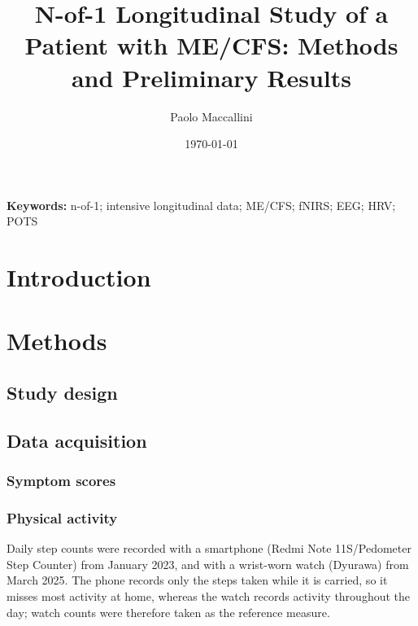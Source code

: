 \documentclass[11pt,a4paper]{article}
\title{N-of-1 Longitudinal Study of a Patient with ME/CFS: Methods and Preliminary Results}
\author[1]{Paolo Maccallini}
\affil[1]{``Independent researcher'', Rome, Italy}
\date{\today}
\begin{document}
\maketitle

\begin{abstract}

\end{abstract}

\noindent\textbf{Keywords:} n-of-1; intensive longitudinal data; ME/CFS; fNIRS; EEG; 
HRV; POTS

\section{Introduction}\label{sec:introduction}


\section{Methods}\label{sec:methods}

\subsection{Study design}\label{sec:design}


\subsection{Data acquisition}\label{sec:acquisition}

\subsubsection{Symptom scores}

\subsubsection{Physical activity}

Daily step counts were recorded with a smartphone (Redmi Note 11S/Pedometer Step Counter) 
from January 2023, and with a wrist-worn watch (Dyurawa) from March 2025. The phone records only the
steps taken while it is carried, so it misses most activity at home, whereas the watch
records activity throughout the day; watch counts were therefore taken as the reference
measure.
\end{document}
